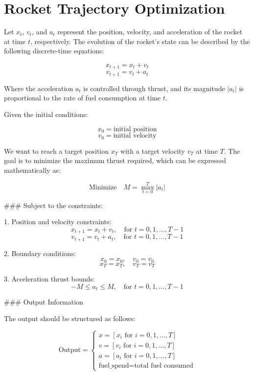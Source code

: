 \documentclass{article}
\begin{document}
\section*{Rocket Trajectory Optimization}

Let \( x_t \), \( v_t \), and \( a_t \) represent the position, velocity, and acceleration of the rocket at time \( t \), respectively. The evolution of the rocket's state can be described by the following discrete-time equations:

\[
x_{t+1} = x_t + v_t
\]
\[
v_{t+1} = v_t + a_t
\]

Where the acceleration \( a_t \) is controlled through thrust, and its magnitude \( |a_t| \) is proportional to the rate of fuel consumption at time \( t \).

Given the initial conditions:

\[
x_0 = \text{initial position}
\]
\[
v_0 = \text{initial velocity}
\]

We want to reach a target position \( x_T \) with a target velocity \( v_T \) at time \( T \). The goal is to minimize the maximum thrust required, which can be expressed mathematically as:

\[
\text{Minimize} \quad M = \max_{t=0}^{T} |a_t|
\]

### Subject to the constraints:

1. Position and velocity constraints:
   \[
   x_{t+1} = x_t + v_t, \quad \text{for } t = 0, 1, \ldots, T-1
   \]
   \[
   v_{t+1} = v_t + a_t, \quad \text{for } t = 0, 1, \ldots, T-1
   \]

2. Boundary conditions:
   \[
   x_0 = x_0, \quad v_0 = v_0
   \]
   \[
   x_T = x_T, \quad v_T = v_T
   \]

3. Acceleration thrust bounds:
   \[
   -M \leq a_t \leq M, \quad \text{for } t = 0, 1, \ldots, T-1
   \]

### Output Information

The output should be structured as follows:

\[
\text{Output} = 
\begin{cases}
x = [x_i \text{ for } i = 0, 1, \ldots, T] \\
v = [v_i \text{ for } i = 0, 1, \ldots, T] \\
a = [a_i \text{ for } i = 0, 1, \ldots, T] \\
\text{fuel\_spend} = \text{total fuel consumed}
\end{cases}
\]
\end{document}
